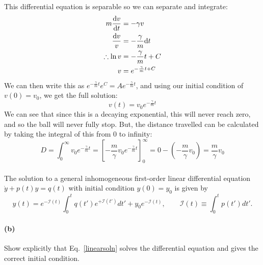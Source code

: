 \documentclass{article}
\begin{document}
\begin{solution}
	This differential equation is separable so we can separate and integrate:
	\begin{align*}
		m \dv{v}{t} &= -\gamma v\\
		\frac{\mathrm d v}{v} &= -\frac{\gamma}{m}\mathrm dt\\
		\therefore \ln v &=  -\frac{\gamma}{m}t + C \\
		v &=  e^{-\frac{\gamma}{m}t + C} 
	\end{align*}
	We can then write this as $e^{-\frac{\gamma}{m}t} e^C = Ae^{-\frac{\gamma}{m}t}$, and using our initial
	condition of $v(0) = v_0$, we get the full solution:
	\[
		v(t) = v_0e^{-\frac{\gamma}{m}t} 
	\] 
	We can see that since this is a decaying exponential, this will never reach zero, and so the ball will 
	never fully stop. But, the distance travelled can be calculated by taking the integral of this 
	from 0 to infinity:
	\[
	D = \int_0^\infty v_0e^{-\frac{\gamma}{m}t} = \left[-\frac{m}{\gamma}v_0e^{-\frac{\gamma}{m}t}\right]_0^\infty = 0 - \left( -\frac{m}{\gamma}v_0 \right)= \frac{m}{\gamma} v_0
	\] 
\end{solution}
\phline
\paragraph{}
The solution to a general inhomogeneous first-order linear differential equation $\dot{y} + p(t)y = q(t)$ with initial condition $y(0) = y_{0}$ is given by
	\begin{equation}
		y(t) = e^{-\mathcal{I}(t)}\int_{0}^{t}q(t')e^{+\mathcal{I}(t')}dt' + y_{0}e^{-\mathcal{I}(t)},	\qquad	\mathcal{I}(t) \equiv \int_{0}^{t} p(t')dt'.
	\label{linearsoln}
	\end{equation}

\paragraph{(b)}
Show explicitly that Eq.~\ref{linearsoln} solves the differential equation and gives the correct initial condition. 
\end{document}
